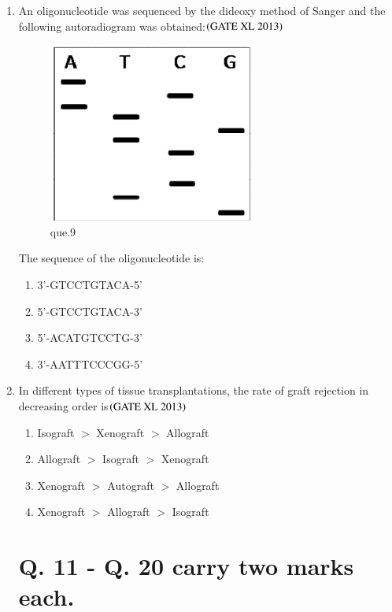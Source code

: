 \documentclass[journal]{IEEEtran}
\begin{document}
\begin{enumerate}
\item An oligonucleotide was sequenced by the dideoxy method of Sanger and the following autoradiogram was obtained:\hfill $\left(\text{GATE XL 2013}\right)$
\begin{figure}[H]
    \centering
    \includegraphics[width=0.75\columnwidth]{figs/Screenshot 2025-08-05 122205.png}
    \caption{que.9}
\end{figure}
The sequence of the oligonucleotide is:
\begin{enumerate}
    \item 3'-GTCCTGTACA-5'
    \item 5'-GTCCTGTACA-3'
    \item 5'-ACATGTCCTG-3'
    \item 3'-AATTTCCCGG-5'
\end{enumerate}

\item In different types of tissue transplantations, the rate of graft rejection in decreasing order is\hfill $\left(\text{GATE XL 2013}\right)$
\begin{enumerate}
    \item Isograft $>$ Xenograft $>$ Allograft
    \item Allograft $>$ Isograft $>$ Xenograft
    \item Xenograft $>$ Autograft $>$ Allograft
    \item Xenograft $>$ Allograft $>$ Isograft
\end{enumerate}

\section*{Q. 11 - Q. 20 carry two marks each.}


\end{enumerate}
\end{document}
